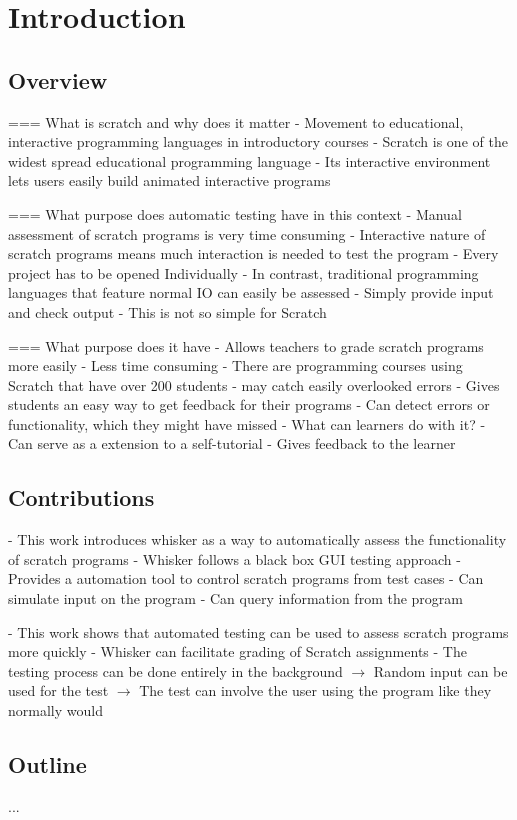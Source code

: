 \chapter{Introduction}

\section{Overview}
=== What is scratch and why does it matter
- Movement to educational, interactive programming languages in introductory courses
- Scratch is one of the widest spread educational programming language
- Its interactive environment lets users easily build animated interactive programs

=== What purpose does automatic testing have in this context
- Manual assessment of scratch programs is very time consuming
- Interactive nature of scratch programs means much interaction is needed to test the program
- Every project has to be opened Individually
- In contrast, traditional programming languages that feature normal IO can easily be assessed
- Simply provide input and check output
- This is not so simple for Scratch

=== What purpose does it have
- Allows teachers to grade scratch programs more easily
    - Less time consuming
        - There are programming courses using Scratch that have over 200 students \cite{itch}
    - may catch easily overlooked errors
    - Gives students an easy way to get feedback for their programs
        - Can detect errors or functionality, which they might have missed
- What can learners do with it?
    - Can serve as a extension to a self-tutorial
    - Gives feedback to the learner

\section{Contributions}
- This work introduces whisker as a way to automatically assess the functionality of scratch programs
- Whisker follows a black box GUI testing approach
- Provides a automation tool to control scratch programs from test cases
    - Can simulate input on the program
    - Can query information from the program

- This work shows that automated testing can be used to assess scratch programs more quickly
- Whisker can facilitate grading of Scratch assignments
- The testing process can be done entirely in the background
    $\rightarrow$ Random input can be used for the test
    $\rightarrow$ The test can involve the user using the program like they normally would

\section{Outline}
...

%
